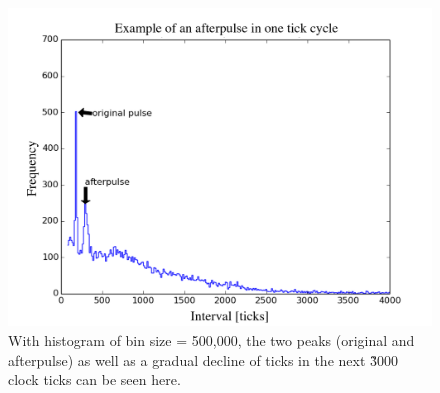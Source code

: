 \documentclass[12pt]{article}
\begin{document}
\begin{figure}[h]
\centering
\includegraphics[width=1\textwidth]{figures/afterpulse}
\caption{With histogram of bin size = 500,000, the two peaks (original and afterpulse) as well as a gradual decline of ticks in the next \~3000 clock ticks can be seen here.}
\label{afterpulse}
\end{figure}
\end{document}
